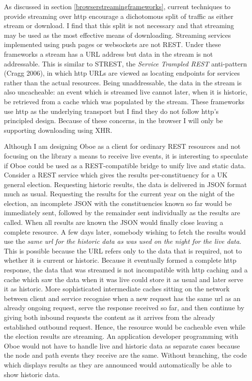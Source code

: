 \documentclass[]{article}
\begin{document}
As discussed in section \ref{browserstreamingframeworks}, current
techniques to provide streaming over http encourage a dichotomous split
of traffic as either stream or download. I find that this split is not
necessary and that streaming may be used as the most effective means of
downloading. Streaming services implemented using push pages or
websockets are not REST. Under these frameworks a stream has a URL
address but data in the stream is not addressable. This is similar to
STREST, the \emph{Service Trampled REST} anti-pattern (Cragg 2006), in
which http URLs are viewed as locating endpoints for services rather
than the actual resources. Being unaddressable, the data in the stream
is also uncacheable: an event which is streamed live cannot later, when
it is historic, be retrieved from a cache which was populated by the
stream. These frameworks use http as the underlying transport but I find
they do not follow http's principled design. Because of these concerns,
in the browser I will only be supporting downloading using XHR.

Although I am designing Oboe as a client for ordinary REST resources and
not focusing on the library a means to receive live events, it is
interesting to speculate if Oboe could be used as a REST-compatible
bridge to unify live and static data. Consider a REST service which
gives the results per-constituency for a UK general election. Requesting
historic results, the data is delivered in JSON format much as usual.
Requesting the results for the current year on the night of the
election, an incomplete JSON with the constituencies known so far would
be immediately sent, followed by the remainder sent individually as the
results are called. When all results are known the JSON would finally
close leaving a complete resource. A few days later, somebody wishing to
fetch the results would use the \emph{same url for the historic data as
was used on the night for the live data}. This is possible because the
URL refers only to the data that is required, not to whether it is
current or historic. Because it eventually formed a complete http
response, the data that was streamed is not incompatible with http
caching and a cache which saw the data when it was live could store it
as usual and later serve it as historic. More sophisticated intermediate
caches sitting on the network between client and service recognise when
a new request has the same url as an already ongoing request, serve the
response received so far, and then continue by giving both inbound
requests the content as it arrives from the already established outbound
request. Hence, the resource would be cacheable even while the election
results are streaming. An application developer programming with Oboe
would not have to handle live and historic data as separate cases
because the node and path events they receive are the same. Without
branching, the code which displays results as they are announced would
automatically be able to show historic data.
\end{document}
